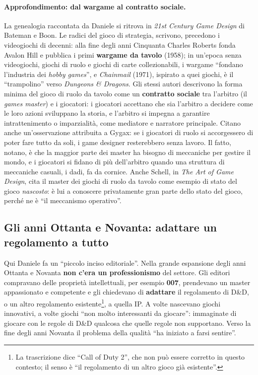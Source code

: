 \paragraph{Approfondimento: dal wargame al contratto sociale.} La genealogia
raccontata da Daniele si ritrova in \emph{21st Century Game Design} di Bateman e
Boon. Le radici del gioco di strategia, scrivono, precedono i videogiochi di
decenni: alla fine degli anni Cinquanta Charles Roberts fonda Avalon Hill e
pubblica i primi \textbf{wargame da tavolo} (1958); in un'epoca senza
videogiochi, giochi di ruolo e giochi di carte collezionabili, i wargame
``fondano l'industria dei \emph{hobby games}'', e \emph{Chainmail} (1971),
ispirato a quei giochi, è il ``trampolino'' verso \emph{Dungeons \& Dragons}. Gli
stessi autori descrivono la forma minima del gioco di ruolo da tavolo come un
\textbf{contratto sociale} tra l'arbitro (il \emph{games master}) e i
giocatori: i giocatori accettano che sia l'arbitro a decidere come le loro azioni
sviluppano la storia, e l'arbitro si impegna a garantire intrattenimento o
imparzialità, come mediatore e narratore principale. Citano anche un'osservazione
attribuita a Gygax: se i giocatori di ruolo si accorgessero di poter fare tutto
da soli, i game designer resterebbero senza lavoro. Il fatto, notano, è che la
maggior parte dei master ha bisogno di meccaniche per gestire il mondo, e i
giocatori si fidano di più dell'arbitro quando una struttura di meccaniche
casuali, i dadi, fa da cornice. Anche Schell, in \emph{The Art of Game Design},
cita il master dei giochi di ruolo da tavolo come esempio di stato del gioco
\emph{nascosto}: è lui a conoscere privatamente gran parte dello stato del gioco,
perché ne è ``il meccanismo operativo''.

\subsection{Gli anni Ottanta e Novanta: adattare un regolamento a tutto}

Qui Daniele fa un ``piccolo inciso editoriale''. Nella grande espansione degli
anni Ottanta e Novanta \textbf{non c'era un professionismo} del settore. Gli
editori compravano delle proprietà intellettuali, per esempio \textbf{007},
prendevano un master appassionato e competente e gli chiedevano di
\textbf{adattare} il regolamento di D\&D, o un altro regolamento
esistente\footnote{La trascrizione dice ``Call of Duty 2'', che non può essere
corretto in questo contesto; il senso è ``il regolamento di un altro gioco
già esistente''.}, a quella IP. A volte nascevano giochi innovativi, a volte
giochi ``non molto interessanti da giocare'': immaginate di giocare con le
regole di D\&D qualcosa che quelle regole non supportano. Verso la fine degli
anni Novanta il problema della qualità ``ha iniziato a farsi sentire''.

